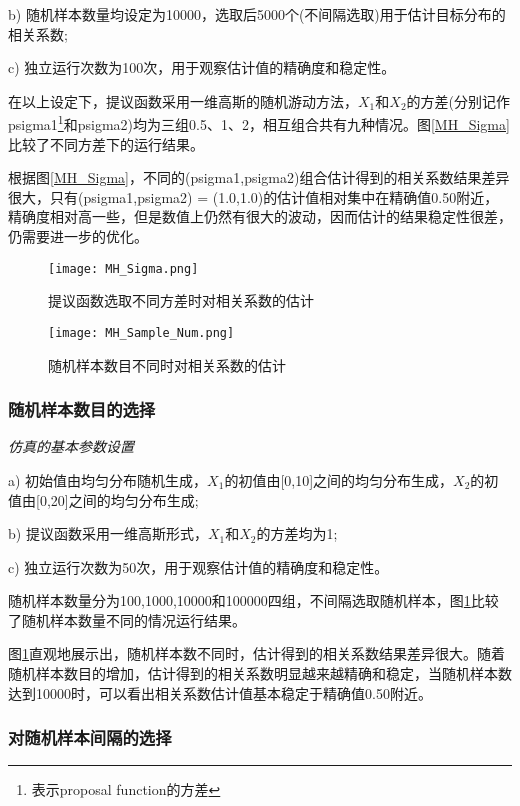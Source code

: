 \documentclass[11pt]{article}
\begin{document}
b) 随机样本数量均设定为10000，选取后5000个(不间隔选取)用于估计目标分布的相关系数;

c) 独立运行次数为100次，用于观察估计值的精确度和稳定性。

在以上设定下，提议函数采用一维高斯的随机游动方法，$X_{1}$和$X_{2}$的方差(分别记作psigma1\footnote{表示proposal function的方差}和psigma2)均为三组0.5、1、2，相互组合共有九种情况。图\ref{MH_Sigma}比较了不同方差下的运行结果。

根据图\ref{MH_Sigma}，不同的(psigma1,psigma2)组合估计得到的相关系数结果差异很大，只有(psigma1,psigma2) = (1.0,1.0)的估计值相对集中在精确值0.50附近，精确度相对高一些，但是数值上仍然有很大的波动，因而估计的结果稳定性很差，仍需要进一步的优化。

\begin{figure}
\begin{minipage}[t]{0.5\linewidth}
    \centering
    \texttt{[image: MH\_Sigma.png]}
    \caption{\scriptsize{提议函数选取不同方差时对相关系数的估计}}
    \label{MH_Sigma}
\end{minipage}
\begin{minipage}[t]{0.5\linewidth}
    \centering
    \texttt{[image: MH\_Sample\_Num.png]}
    \caption{\scriptsize{随机样本数目不同时对相关系数的估计}}
    \label{MH_Sample_Num}
\end{minipage}
\end{figure}

\subsubsection{随机样本数目的选择}

\noindent\emph{仿真的基本参数设置}

a) 初始值由均匀分布随机生成，$X_{1}$的初值由[0,10]之间的均匀分布生成，$X_{2}$的初值由[0,20]之间的均匀分布生成;

b) 提议函数采用一维高斯形式，$X_{1}$和$X_{2}$的方差均为1;

c) 独立运行次数为50次，用于观察估计值的精确度和稳定性。

随机样本数量分为100,1000,10000和100000四组，不间隔选取随机样本，图\ref{MH_Sample_Num}比较了随机样本数量不同的情况运行结果。

图\ref{MH_Sample_Num}直观地展示出，随机样本数不同时，估计得到的相关系数结果差异很大。随着随机样本数目的增加，估计得到的相关系数明显越来越精确和稳定，当随机样本数达到10000时，可以看出相关系数估计值基本稳定于精确值0.50附近。

\subsubsection{对随机样本间隔的选择}
\end{document}
